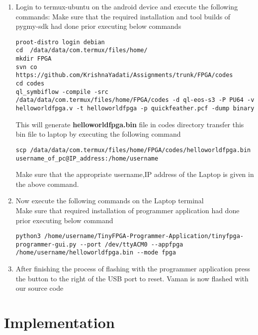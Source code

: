 \documentclass[10pt, a4paper]{article}
\begin{document}
\begin{enumerate}
\item Login to termux-ubuntu on the android device and execute the following commands:
\vspace{10mm}
Make sure that the required installation and tool builds of pygmy-sdk had done prior executing below commands\\

\begin{lstlisting}
proot-distro login debian
cd  /data/data/com.termux/files/home/
mkdir FPGA
svn co https://github.com/KrishnaYadati/Assignments/trunk/FPGA/codes
cd codes
ql_symbiflow -compile -src /data/data/com.termux/files/home/FPGA/codes -d ql-eos-s3 -P PU64 -v helloworldfpga.v -t helloworldfpga -p quickfeather.pcf -dump binary
\end{lstlisting}
This will generate \textbf{helloworldfpga.bin} file in codes directory transfer this bin file to laptop by executing the following command\\
\vspace{2mm}
\begin{lstlisting}
scp /data/data/com.termux/files/home/FPGA/codes/helloworldfpga.bin username_of_pc@IP_address:/home/username
\end{lstlisting}
Make sure that the appropriate username,IP address of the Laptop is given in the above command.\\
\vspace{5mm}
\item Now execute the following commands on the Laptop terminal\\
Make sure that required installation of programmer application had done prior executing below command\\
\vspace{5mm}
\begin{lstlisting}
python3 /home/username/TinyFPGA-Programmer-Application/tinyfpga-programmer-gui.py --port /dev/ttyACM0 --appfpga /home/username/helloworldfpga.bin --mode fpga
\end{lstlisting}
\vspace{5mm}
\item After finishing the process of flashing with the programmer application press the button to the right of the USB port to reset. Vaman is now flashed with our source code
\end{enumerate}

\section{Implementation}
\end{document}
